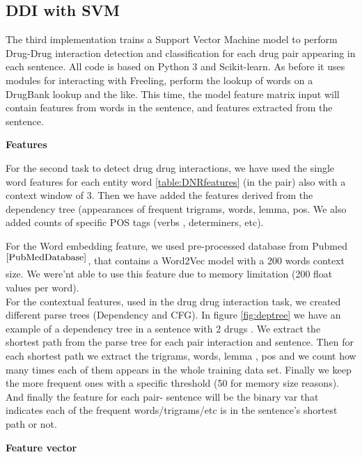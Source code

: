 \subsection{DDI with SVM}

The third implementation trains a Support Vector Machine model to perform Drug-Drug interaction detection and classification for each drug pair appearing in each sentence. All code is based on Python 3 and Scikit-learn. As before it uses modules for interacting with Freeling, perform the lookup of words on a DrugBank lookup and the like. This time, the model feature matrix input will contain features from words in the sentence, and features extracted from the sentence.

\textbf{Features}


For the second task to detect drug drug interactions, we have used the single word features for each entity word  \ref{table:DNRfeatures} (in the pair) also with a context window of 3. Then we have added the features derived from the dependency tree (appearances of frequent trigrams, words, lemma, pos. We also added counts of specific POS tags (verbs , determiners, etc).




For the Word embedding feature, we used pre-processed database from Pubmed$^{\cite{PubMedDatabase}}$, that contains a Word2Vec model with a 200 words context size. We were'nt able to use this feature due to memory limitation (200 float values per word).\\
For the contextual features, used in the drug drug interaction task, we created different parse trees (Dependency and CFG). In figure \ref{fig:deptree}  we have an example of a dependency tree in a sentence with 2 drugs . We extract the shortest path from the parse tree for each pair interaction and sentence. Then for each shortest path we extract the trigrams, words, lemma , pos and we count how many times each of them appears in the whole training data set. Finally we keep the more frequent ones with a specific threshold (50 for memory size reasons). And finally the feature for each pair- sentence will be the binary var that indicates each of the frequent words/trigrams/etc is in the sentence's shortest path or not.

\textbf{Feature vector}


